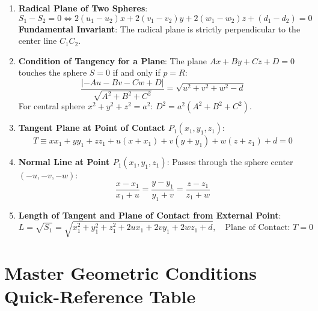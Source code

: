 \begin{theorembox}
\begin{enumerate}
    \item \textbf{Radical Plane of Two Spheres}:
    \begin{equation}
        \boxed{S_1 - S_2 = 0 \iff 2(u_1 - u_2)x + 2(v_1 - v_2)y + 2(w_1 - w_2)z + (d_1 - d_2) = 0}
    \end{equation}
    \textbf{Fundamental Invariant}: The radical plane is strictly perpendicular to the center line $C_1 C_2$.
    \item \textbf{Condition of Tangency for a Plane}:
    The plane $Ax + By + Cz + D = 0$ touches the sphere $S = 0$ if and only if $p = R$:
    \begin{equation}
        \boxed{\frac{|-Au - Bv - Cw + D|}{\sqrt{A^2 + B^2 + C^2}} = \sqrt{u^2 + v^2 + w^2 - d}}
    \end{equation}
    For central sphere $x^2 + y^2 + z^2 = a^2$: $\displaystyle \boxed{D^2 = a^2(A^2 + B^2 + C^2)}$.
    \item \textbf{Tangent Plane at Point of Contact $P_1(x_1, y_1, z_1)$}:
    \begin{equation}
        \boxed{T \equiv x x_1 + y y_1 + z z_1 + u(x + x_1) + v(y + y_1) + w(z + z_1) + d = 0}
    \end{equation}
    \item \textbf{Normal Line at Point $P_1(x_1, y_1, z_1)$}:
    Passes through the sphere center $(-u, -v, -w)$:
    \begin{equation}
        \boxed{\frac{x - x_1}{x_1 + u} = \frac{y - y_1}{y_1 + v} = \frac{z - z_1}{z_1 + w}}
    \end{equation}
    \item \textbf{Length of Tangent and Plane of Contact from External Point}:
    \begin{equation}
        \boxed{L = \sqrt{S_1} = \sqrt{x_1^2 + y_1^2 + z_1^2 + 2ux_1 + 2vy_1 + 2wz_1 + d}}, \quad \text{Plane of Contact: } \boxed{T = 0}
    \end{equation}
\end{enumerate}
\end{theorembox}

\section{Master Geometric Conditions Quick-Reference Table}

